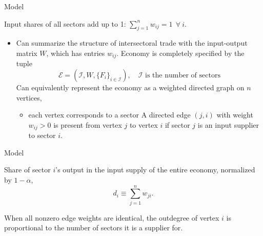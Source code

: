 \documentclass[dvipsnames]{beamer}
\begin{document}
\begin{frame}{Model}
  \begin{assumption}[Assumption 1]
    Input shares of all sectors add up to 1: $\sum \limits_{j=1}^n w_{ij}=1 \ \ \forall \ i$. 
  \end{assumption}
  \begin{itemize}
\item Can summarize the structure of intersectoral trade with the input-output matrix $W$, which has entries $w_{ij}$.
\vitem Economy is completely specified by the tuple
  \[
\mathcal{E} = (\mathcal{I}, W, \{F_i\}_{i \in \mathcal{I}}),\quad \mathcal{I} \text{ is the number of sectors} 
\]
\vitem Can equivalently represent the economy as a weighted directed graph on $n$ vertices, 
  \begin{itemize}
  \item each vertex corresponds to a sector
    \vitem A directed edge $(j, i)$ with weight $w_{ij}>0$ is present from
vertex $j$ to vertex $i$ if sector $j$ is an input supplier to sector $i$.
  \end{itemize}
 
\end{itemize}

\end{frame}
%
\begin{frame}{Model}
  \begin{definition}
    Share of sector $i$'s output in the input supply of the entire economy, normalized by $1 - \alpha$,
    \[
d_i \equiv \sum^n_{j = 1} w_{ji}.
    \]
  \end{definition}
  \begin{itemize}
  \vitem  When all nonzero edge weights are identical, the outdegree of vertex $i$ is proportional to the number of sectors it is a supplier for.
  \end{itemize}
\end{frame}
\end{document}
